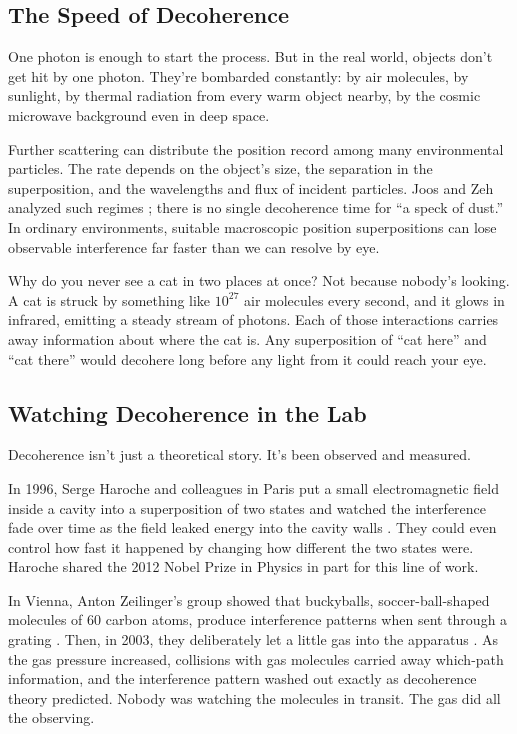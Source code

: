 \subsection{The Speed of Decoherence}

One photon is enough to start the process. But in the real world, objects don't get hit by one photon. They're bombarded constantly: by air molecules, by sunlight, by thermal radiation from every warm object nearby, by the cosmic microwave background even in deep space.

Further scattering can distribute the position record among many environmental particles. The rate depends on the object's size, the separation in the superposition, and the wavelengths and flux of incident particles. Joos and Zeh analyzed such regimes \cite{joos1985}; there is no single decoherence time for ``a speck of dust.'' In ordinary environments, suitable macroscopic position superpositions can lose observable interference far faster than we can resolve by eye.

\begin{examplebox}
Why do you never see a cat in two places at once? Not because nobody's looking. A cat is struck by something like \(10^{27}\) air molecules every second, and it glows in infrared, emitting a steady stream of photons. Each of those interactions carries away information about where the cat is. Any superposition of ``cat here'' and ``cat there'' would decohere long before any light from it could reach your eye.
\end{examplebox}

\subsection{Watching Decoherence in the Lab}

Decoherence isn't just a theoretical story. It's been observed and measured.

In 1996, Serge Haroche and colleagues in Paris put a small electromagnetic field inside a cavity into a superposition of two states and watched the interference fade over time as the field leaked energy into the cavity walls \cite{brune1996}. They could even control how fast it happened by changing how different the two states were. Haroche shared the 2012 Nobel Prize in Physics in part for this line of work.

In Vienna, Anton Zeilinger's group showed that buckyballs, soccer-ball-shaped molecules of 60 carbon atoms, produce interference patterns when sent through a grating \cite{arndt1999}. Then, in 2003, they deliberately let a little gas into the apparatus \cite{hornberger2003}. As the gas pressure increased, collisions with gas molecules carried away which-path information, and the interference pattern washed out exactly as decoherence theory predicted. Nobody was watching the molecules in transit. The gas did all the observing.

